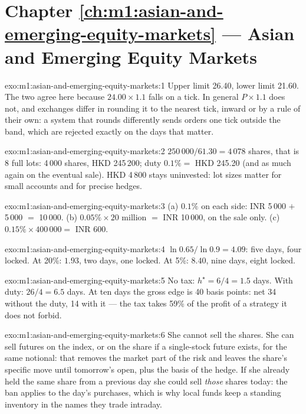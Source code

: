 \section*{Chapter \ref{ch:m1:asian-and-emerging-equity-markets} --- Asian and Emerging Equity Markets}

\begin{solution}{exo:m1:asian-and-emerging-equity-markets:1}
Upper limit 26.40, lower limit 21.60. The two agree here because
$24.00\times1.1$ falls on a tick. In general $P\times1.1$ does not, and
exchanges differ in rounding it to the nearest tick, inward or by a rule of
their own: a system that rounds differently sends orders one tick outside the
band, which are rejected exactly on the days that matter.
\end{solution}

\begin{solution}{exo:m1:asian-and-emerging-equity-markets:2}
$250\,000/61.30 = 4\,078$ shares, that is 8 full lots: 4\,000 shares, HKD
245\,200; duty $0.1\% = $ HKD 245.20 (and as much again on the eventual
sale). HKD 4\,800 stays uninvested: lot sizes matter for small accounts and
for precise hedges.
\end{solution}

\begin{solution}{exo:m1:asian-and-emerging-equity-markets:3}
(a) $0.1\%$ on each side: INR 5\,000 $+$ 5\,000 $=$ 10\,000. (b) $0.05\%
\times 20$ million $=$ INR 10\,000, on the sale only. (c) $0.15\% \times
400\,000 =$ INR 600.
\end{solution}

\begin{solution}{exo:m1:asian-and-emerging-equity-markets:4}
$\ln0.65/\ln0.9 = 4.09$: five days, four locked. At 20\%: $1.93$, two days,
one locked. At 5\%: $8.40$, nine days, eight locked.
\end{solution}

\begin{solution}{exo:m1:asian-and-emerging-equity-markets:5}
No tax: $h^\star = 6/4 = 1.5$ days. With duty: $26/4 = 6.5$ days. At ten
days the gross edge is 40 basis points: net 34 without the duty, 14 with it
--- the tax takes 59\% of the profit of a strategy it does not forbid.
\end{solution}

\begin{solution}{exo:m1:asian-and-emerging-equity-markets:6}
She cannot sell the shares. She can sell futures on the index, or on the
share if a single-stock future exists, for the same notional: that removes
the market part of the risk and leaves the share's specific move until
tomorrow's open, plus the basis of the hedge. If she already held the same
share from a previous day she could sell \emph{those} shares today: the ban
applies to the day's purchases, which is why local funds keep a standing
inventory in the names they trade intraday.
\end{solution}


